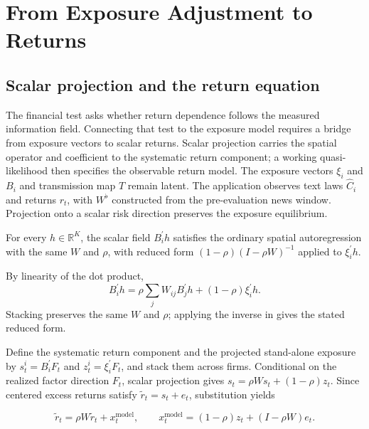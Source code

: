 \section{From Exposure Adjustment to Returns}
\label{sec:identification-estimation}

\subsection{Scalar projection and the return equation}
\label{sec:exposures-to-returns}

The financial test asks whether return dependence follows the measured
information field.
Connecting that test to the exposure model requires a bridge from exposure
vectors to scalar returns.
Scalar projection carries the spatial operator and coefficient to the
systematic return component; a working quasi-likelihood then specifies the
observable return model.
The exposure vectors $\xi_i$ and $B_i$ and transmission map $T$ remain latent.
The application observes text laws $\widehat C_i$ and returns $r_t$, with
$W^\flat$ constructed from the pre-evaluation news window.
Projection onto a scalar risk direction preserves the exposure equilibrium.

\begin{proposition}\label{prop:scalar-projection}
  For every $h\in\mathbb R^K$, the scalar field $B_i^{\prime}h$ satisfies the
  ordinary spatial autoregression with the same $W$ and $\rho$, with reduced
  form $(1-\rho)(I-\rho W)^{-1}$ applied to $\xi_i^{\prime}h$.
\end{proposition}
By linearity of the dot product,
\[
  B_i^{\prime}h
  =\rho\sum_j W_{ij}B_j^{\prime}h
  +(1-\rho)\xi_i^{\prime}h.
\]
Stacking preserves the same $W$ and $\rho$; applying the inverse in
 gives the stated reduced form.

Define the systematic return component and the projected stand-alone exposure
by $s_t^i=B_i^{\prime}F_t$ and $z_t^i=\xi_i^{\prime}F_t$, and stack them
across firms.
Conditional on the realized factor direction $F_t$, scalar projection gives
$s_t=\rho Ws_t+(1-\rho)z_t$.
Since centered excess returns satisfy $\widetilde r_t=s_t+e_t$, substitution
yields

\begin{equation}\label{eq:model-return-innovation}
  \widetilde r_t
  =\rho W\widetilde r_t+x_t^{\mathrm{model}},
  \qquad
  x_t^{\mathrm{model}}
  =(1-\rho)z_t+(I-\rho W)e_t.
\end{equation}

